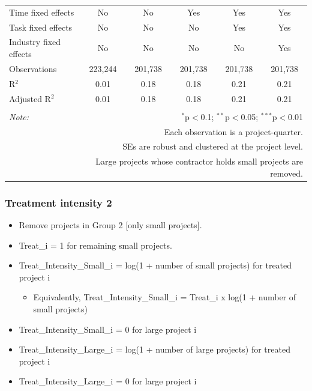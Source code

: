 \documentclass[
]{article}
\providecommand{\tightlist}{%
  \setlength{\itemsep}{0pt}\setlength{\parskip}{0pt}}
\begin{document}
\begin{table}[H]
\begin{tabular}{@{\extracolsep{-2pt}}lccccc}
Time fixed effects & No & No & Yes & Yes & Yes \\ 
Task fixed effects & No & No & No & Yes & Yes \\ 
Industry fixed effects & No & No & No & No & Yes \\ 
Observations & 223,244 & 201,738 & 201,738 & 201,738 & 201,738 \\ 
R$^{2}$ & 0.01 & 0.18 & 0.18 & 0.21 & 0.21 \\ 
Adjusted R$^{2}$ & 0.01 & 0.18 & 0.18 & 0.21 & 0.21 \\ 
\hline 
\hline \\[-1.8ex] 
\textit{Note:}  & \multicolumn{5}{r}{$^{*}$p$<$0.1; $^{**}$p$<$0.05; $^{***}$p$<$0.01} \\ 
 & \multicolumn{5}{r}{Each observation is a project-quarter.} \\ 
 & \multicolumn{5}{r}{SEs are robust and clustered at the project level.} \\ 
 & \multicolumn{5}{r}{Large projects whose contractor holds small projects are removed.} \\ 
\end{tabular} 
\end{table}

\hypertarget{treatment-intensity-2}{%
\subsubsection{Treatment intensity 2}\label{treatment-intensity-2}}

\begin{itemize}
\tightlist
\item
  Remove projects in Group 2 {[}only small projects{]}.
\item
  Treat\_i = 1 for remaining small projects.
\item
  Treat\_Intensity\_Small\_i = log(1 + number of small projects) for
  treated project i

  \begin{itemize}
  \tightlist
  \item
    Equivalently, Treat\_Intensity\_Small\_i = Treat\_i x log(1 + number
    of small projects)
  \end{itemize}
\item
  Treat\_Intensity\_Small\_i = 0 for large project i
\item
  Treat\_Intensity\_Large\_i = log(1 + number of large projects) for
  treated project i
\item
  Treat\_Intensity\_Large\_i = 0 for large project i
\end{itemize}
\end{document}

